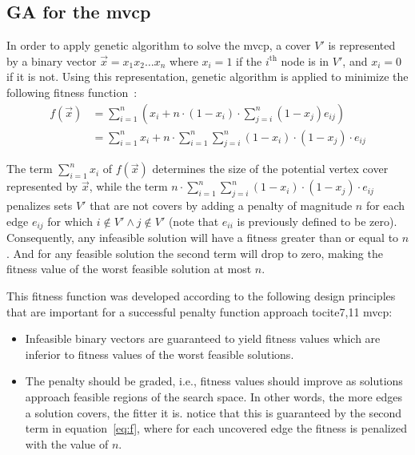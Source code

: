 \documentclass[12pt]{article}
\begin{document}
\subsection{GA for the mvcp}
\label{sec:GAmvcp}
In order to apply genetic algorithm to solve the mvcp, a cover $V'$ is represented
by a binary vector $\vec{x} = x_1x_2 \dots x_n$ where $x_i = 1$ if
the $i^{\text{th}}$ node is in $V'$, and $x_i = 0$ if it is not.
Using this representation, genetic algorithm is applied to minimize the following
fitness function~\cite{mvcp-back}:
\begin{equation}
\label{eq:f}
\begin{split}
f(\vec{x})	&= \sum_{i=1}^{n} \left( x_i+n \cdot (1-x_i) \cdot
			   \sum_{j=i}^{n} (1-x_j) e_{ij} \right) \\
 			&= \sum_{i=1}^{n} x_i + n \cdot \sum_{i=1}^{n}
			   \sum_{j=i}^{n} (1-x_i) \cdot (1-x_j) \cdot e_{ij}
\end{split}
\end{equation}

The term $ \sum_{i=1}^{n} x_i $ of $ f(\vec{x}) $ determines the size of the
potential vertex cover represented by $\vec{x}$, while the term
$ n \cdot \sum_{i=1}^{n} \sum_{j=i}^{n} (1-x_i) \cdot (1-x_j) \cdot e_{ij} $
penalizes sets $V'$ that
are not covers by adding a penalty of magnitude $n$ for
each edge $e_{ij}$ for which $i \notin V' \wedge j \notin V'$
(note that $e_{ii}$ is previously defined to be zero).
Consequently, any infeasible solution will have a fitness greater than
or equal to $n$. And for any feasible solution the second term will
drop to zero, making the fitness value of the worst feasible solution at most $n$.

This fitness function was developed according to the
following design principles that are important for a
successful penalty function approach tocite{7,11 mvcp}:
\begin{itemize}
\vspace{-4mm}

\item Infeasible binary vectors are guaranteed to yield fitness
values which are inferior to fitness values of
the worst feasible solutions.

\item The penalty should be graded, i.e., fitness values
should improve as solutions approach feasible regions
of the search space. In other words, the more edges a solution
covers, the fitter it is. notice that this is guaranteed by the
second term in equation~\ref{eq:f}, where for each uncovered edge
the fitness is penalized with the value of $n$.
\end{itemize}
\end{document}
